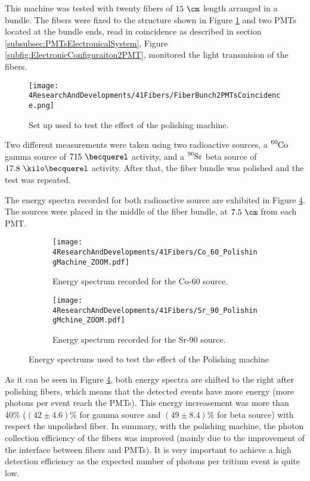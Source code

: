 This machine was tested with twenty fibers of $15~\cm$ length arranged in a bundle. The fibers were fixed to the structure shown in Figure \ref{fig:BunchWith2PMTsCoincidence} and two PMTs located at the bundle ends, read in coincidence as described in section \ref{subsubsec:PMTsElectronicalSystem}, Figure \ref{subfig:ElectronicConfiguraiton2PMT}, monitored the light transmision of the fibers.

\begin{figure}[]
\centering
\texttt{[image: 4ResearchAndDevelopments/41Fibers/FiberBunch2PMTsCoincidence.png]}
\caption{Set up used to test the effect of the polishing machine.\label{fig:BunchWith2PMTsCoincidence}}
\end{figure}

Two different measurements were taken using two radioactive sources, a $\ce{^{60}Co}$ gamma source of $715~\becquerel$ activity, and a $\ce{^{90}Sr}$ beta source of $17.8~\kilo\becquerel$ activity. After that, the fiber bundle was polished and the test was repeated.

The energy spectra recorded for both radioactive source are exhibited in Figure \ref{fig:ResultsOfPolishingMachine}. The sources were placed in the middle of the fiber bundle, at $7.5~\cm$ from each PMT.

\begin{figure}
\centering
    \begin{subfigure}[b]{1\textwidth}
    \centering
    \texttt{[image: 4ResearchAndDevelopments/41Fibers/Co\_60\_PolishingMachine\_ZOOM.pdf]}  
    \caption{Energy spectrum recorded for the Co-60 source.\label{subfig:EnergySpectrumCo60PolishingTest}}
    \end{subfigure}
    \hfill
    \begin{subfigure}[b]{1\textwidth}
    \centering
    \texttt{[image: 4ResearchAndDevelopments/41Fibers/Sr\_90\_PolishingMchine\_ZOOM.pdf]}  
    \caption{Energy spectrum recorded for the Sr-90 source.\label{subfig:EnergySpectrumSr90PolishingTest}}
    \end{subfigure}
 \caption{Energy spectrums used to test the effect of the Polishing machine}
 \label{fig:ResultsOfPolishingMachine}
\end{figure}

As it can be seen in Figure \ref{fig:ResultsOfPolishingMachine}, both energy spectra are shifted to the right after polishing fibers, which means that the detected events have more energy (more photons per event reach the PMTs). This energy increasement was more than 40\% ($(42 \pm 4.6)\%$ for gamma source and $(49 \pm 8.4)\%$ for beta source) with respect the unpolished fiber. In summary, with the polishing machine, the photon collection efficiency of the fibers was improved  (mainly due to the improvement of the interface between fibers and PMTs). It is very important to achieve a high detection efficiency as the expected number of photons per tritium event is quite low.